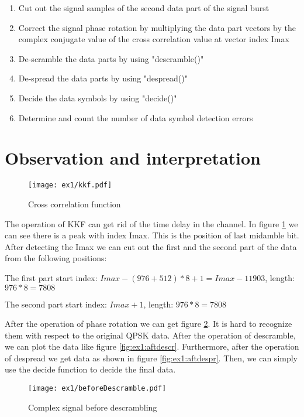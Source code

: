 \begin{enumerate}
\begin{enumerate}[label = (\alph*)]
		\item Cut out the signal samples of the second data part of the signal burst
		\item Correct the signal phase rotation by multiplying the data part vectors by the complex conjugate value of the cross correlation value at vector index Imax
		\item De-scramble the data parts by using "descramble()"
		\item De-spread the data parts by using "despread()"
		\item Decide the data symbols by using "decide()"
		\item Determine and count the number of data symbol detection errors
	\end{enumerate}
\end{enumerate}

\section{Observation and interpretation}
\begin{figure}[H]
	\begin{center}
		\texttt{[image: ex1/kkf.pdf]}
		\caption{Cross correlation function}
		\label{kkf}
	\end{center}
\end{figure}
The operation of KKF can get rid of the time delay in the channel. In figure \ref{kkf} we can see there is a peak with index Imax. This is the position of last midamble bit. After detecting the Imax we can cut out the first and the second part of the data from the following positions:

The first part start index: $Imax - (976 + 512)*8 +1 = Imax - 11903$, length: $976*8 = 7808$

The second part start index: $Imax+1$, length: $976*8 = 7808$

After the operation of  phase rotation we can get figure \ref{fig:ex1:beDescr}. It is hard to recognize them with respect to the original QPSK data. After the operation of descramble, we can plot the data like figure \ref{fig:ex1:aftdescr}. Furthermore, after the operation of despread we get data as shown in figure \ref{fig:ex1:aftdespr}. Then, we can simply use the decide function to decide the final data.
\begin{figure}[H]
	\begin{center}
		\texttt{[image: ex1/beforeDescramble.pdf]}
		\caption{Complex signal before descrambling}
		\label{fig:ex1:beDescr}
	\end{center}
\end{figure} 

